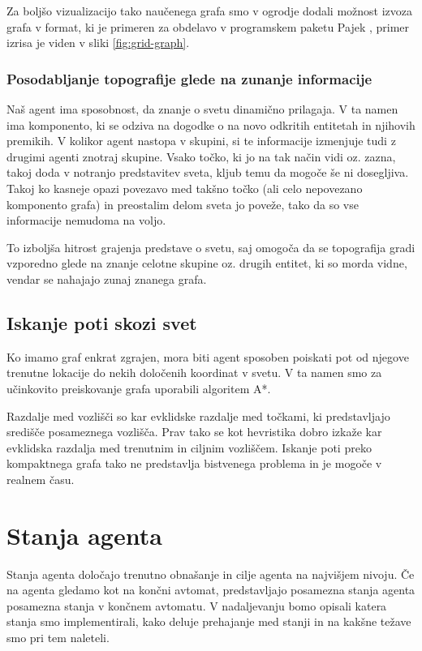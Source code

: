 \documentclass[a4paper,10pt]{article}
\begin{document}
Za boljšo vizualizacijo tako naučenega grafa smo v ogrodje dodali možnost izvoza grafa v format, ki je primeren za obdelavo v programskem paketu Pajek \cite{batagelj97}, primer izrisa je viden v sliki \ref{fig:grid-graph}.

\subsubsection{Posodabljanje topografije glede na zunanje informacije}

Naš agent ima sposobnost, da znanje o svetu dinamično prilagaja. V ta namen ima komponento, ki se odziva na dogodke o na novo odkritih entitetah in njihovih premikih. V kolikor agent nastopa v skupini, si te informacije izmenjuje tudi z drugimi agenti znotraj skupine. Vsako točko, ki jo na tak način vidi oz. zazna, takoj doda v notranjo predstavitev sveta, kljub temu da mogoče še ni dosegljiva. Takoj ko kasneje opazi povezavo med takšno točko (ali celo nepovezano komponento grafa) in preostalim delom sveta jo poveže, tako da so vse informacije nemudoma na voljo.

To izboljša hitrost grajenja predstave o svetu, saj omogoča da se topografija gradi vzporedno glede na znanje celotne skupine oz. drugih entitet, ki so morda vidne, vendar se nahajajo zunaj znanega grafa.

\subsection{Iskanje poti skozi svet}

Ko imamo graf enkrat zgrajen, mora biti agent sposoben poiskati pot od njegove trenutne lokacije do nekih določenih koordinat v svetu. V ta namen smo za učinkovito preiskovanje grafa uporabili algoritem A*.

Razdalje med vozlišči so kar evklidske razdalje med točkami, ki predstavljajo središče posameznega vozlišča. Prav tako se kot hevristika dobro izkaže kar evklidska razdalja med trenutnim in ciljnim vozliščem. Iskanje poti preko kompaktnega grafa tako ne predstavlja bistvenega problema in je mogoče v realnem času.

\section{Stanja agenta}
Stanja agenta določajo trenutno obnašanje in cilje agenta na najvišjem nivoju. Če na agenta gledamo kot na končni avtomat, predstavljajo posamezna stanja agenta posamezna stanja v končnem avtomatu. V nadaljevanju bomo opisali katera stanja smo implementirali, kako deluje prehajanje med stanji in na kakšne težave smo pri tem naleteli.
\end{document}

